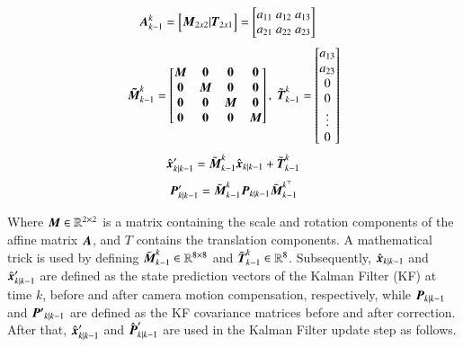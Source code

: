 \begin{equation}
  \begin{aligned}
      & \vb*{A}_{k-1}^k = 
      \begin{bmatrix}
          \vb*{M}_{2x2} | \vb*{T}_{2x1}
      \end{bmatrix} = 
      \begin{bmatrix}
          a_{11}\;a_{12}\;a_{13} \\ a_{21}\;a_{22}\;a_{23} \\ 
      \end{bmatrix}
  \end{aligned}
\end{equation}
\begin{equation}
  \begin{aligned}
  {
      \vb*{\tilde{M}}}^k_{k-1} = 
      \begin{bmatrix}
      \vb*{M} & \vb*{0} & \vb*{0} & \vb*{0} \\
      \vb*{0} & \vb*{M} & \vb*{0} & \vb*{0} \\
      \vb*{0} & \vb*{0} & \vb*{M} & \vb*{0} \\
      \vb*{0} & \vb*{0} & \vb*{0} & \vb*{M}
      \end{bmatrix}, \; 
      \tilde{\vb*{T}}_{k-1}^k = 
      \begin{bmatrix}a_{13}\\a_{23}\\ 0\\ 0\\ \vdots \\ 0\end{bmatrix}
  \end{aligned}
\end{equation}
\begin{equation}
  \begin{aligned}
      \hat{\vb*{x}}^\prime_{k|k-1} = \tilde{\vb*{M}}_{k-1}^k \hat{\vb*{x}}_{k|k-1} + \tilde{\vb*{T}}_{k-1}^k \\
  \end{aligned}
\end{equation}
\begin{equation}
    {{\vb*{P}}}^{\prime}_{k|k-1} = 
    \tilde{\vb*{M}}_{k-1}^k {\vb*{P}}_{k|k-1} {\tilde{\vb*{M}}_{k-1}}^{k^\top}
    \label{eq:cmc_cov}        
\end{equation}

Where $\vb*{M}\in \mathbb{R}^{2 \times 2}$ is a matrix containing the scale and rotation components of the affine matrix $\vb*{A}$, and $T$ contains the translation components. A mathematical trick is used by defining $\tilde{\vb*{M}}^k_{k-1}\in \mathbb{R}^{8 \times 8}$ and $\tilde{\vb*{T}}_{k-1}^k\in \mathbb{R}^{8}$. Subsequently, $\hat{\vb*{x}}_{k|k-1}$ and $\hat{\vb*{x}}^\prime_{k|k-1}$ are defined as the state prediction vectors of the Kalman Filter (KF) at time $k$, before and after camera motion compensation, respectively, while $\vb*{P}_{k|k-1}$ and $\vb*{P'}_{k|k-1}$ are defined as the KF covariance matrices before and after correction. After that, $\hat{\vb*{x}}^\prime_{k|k-1}$ and ${{\hat{\vb*{P}}}^{\prime}}_{k|k-1}$ are used in the Kalman Filter update step as follows.

